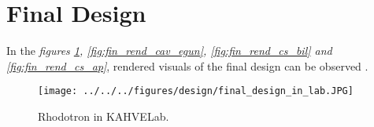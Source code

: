 \documentclass{book}
\begin{document}
\newcommand{\vecthreeBF}[1]{\vec{\textbf{#1}}}
\newcommand{\vecthree}[1]{\vec{#1}}
\newcommand{\vecNum}[3]{(#1, #2, #3)}

\newcommand{\parDeriv}[2]{\frac{\partial #1}{\partial #2}}
\newcommand{\parDerivS}[2]{\frac{\partial^2 #1}{\partial #2^2}}
\newcommand{\derivS}[2]{\frac{d^2 #1}{d#2^2}}

\newcommand{\dotProdBF}[2]{\vecthreeBF{#1} \cdot \vecthreeBF{#2}}
\newcommand{\dotProd}[2]{\vecthree{#1} \cdot \vecthree{#2}}

\newcommand{\crossProdBF}[2]{\vecthreeBF{#1} \times \vecthreeBF{#2}}
\newcommand{\crossProd}[2]{\vecthree{#1} \times \vecthree{#2}}

\newcommand{\e}{$\textbf{e}^-$ }
\newcommand{\egun}{$\textbf{e}^-$-gun }
\newcommand{\eB}{$\textbf{e}^-$ - $\vecthreeBF{B}$ }
\newcommand{\eE}{$\textbf{e}^-$ - $\vecthreeBF{E}$ }
\newcommand{\eEM}{$\textbf{e}^-$ - \textbf{EM} }
\newcommand{\ee}{$\textbf{e}^-$ - $\textbf{e}^-$ }


\newcommand{\fromeq}[1]{\textit{equation \ref{eq:#1}}}
\newcommand{\fromeqs}[2]{\textit{equations \ref{eq:#1} and \ref{eq:#2}}}
\newcommand{\fromeqsth}[3]{\textit{equations \ref{eq:#1}, \ref{eq:#2} and \ref{eq:#3}}}
\newcommand{\fromeqsf}[4]{\textit{equations \ref{eq:#1}, \ref{eq:#2}, \ref{eq:#3} and \ref{eq:#4}}}

\newcommand{\fromfig}[1]{\textit{figure \ref{fig:#1}}}
\newcommand{\fromfigs}[2]{\textit{figures \ref{fig:#1} and \ref{fig:#2}}}
\newcommand{\fromfigf}[4]{\textit{figures \ref{fig:#1}, \ref{fig:#2}, \ref{fig:#3} and \ref{fig:#4}}}

\newcommand{\fromsec}[1]{\textit{section \ref{sec:#1}}}
\newcommand{\fromsecs}[2]{\textit{sections \ref{sec:#1} and \ref{sec:#2}}}

\newcommand{\fromapp}[1]{\textit{Appendix \ref{appendix:#1}}}

\newcommand{\fromtab}[1]{\textit{Table \ref{tab:#1}}}
\newcommand{\fromtabs}[2]{\textit{Tables \ref{tab:#1} and \ref{tab:#2}}}




\section{Final Design} \label{sec:final_design}
In the \fromfigf{fin_rend_lab}{fin_rend_cav_egun}{fin_rend_cs_bil}{fin_rend_cs_ap}, 
rendered visuals of the final design can be observed \cite{sinan}.
\vspace{20pt}
\begin{figure}[H]
    \centering
    \texttt{[image: ../../../figures/design/final\_design\_in\_lab.JPG]}
    \vspace{10pt}
    \caption{Rhodotron in KAHVELab.}
    \label{fig:fin_rend_lab}
\end{figure}
\end{document}
